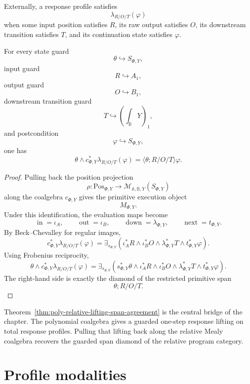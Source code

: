 Externally, a response profile satisfies
\[
\lambda_{R/O/T}(\varphi)
\]
when some input position satisfies \(R\), its raw output satisfies \(O\), its
downstream transition satisfies \(T\), and its continuation state satisfies
\(\varphi\).

\begin{theorem}
\label{thm:poly-relative-lifting-span-agreement}
For every state guard
\[
\theta\hookrightarrow S_{\Phi,Y},
\]
input guard
\[
R\hookrightarrow A_1,
\]
output guard
\[
O\hookrightarrow B_1,
\]
downstream transition guard
\[
T\hookrightarrow\left(\int_{\mathbb B}Y\right)_1,
\]
and postcondition
\[
\varphi\hookrightarrow S_{\Phi,Y},
\]
one has
\[
\theta\wedge c_{\Phi,Y}^{\ast}\lambda_{R/O/T}(\varphi)
=
\langle \theta;R/O/T\rangle\varphi.
\]
\end{theorem}

\begin{proof}
Pulling back the position projection
\[
\rho:\mathrm{Pos}_{\Phi,Y}\to
\mathcal M_{\mathbb A,\mathbb B,Y}(S_{\Phi,Y})
\]
along the coalgebra \(c_{\Phi,Y}\) gives the primitive execution object
\[
M_{\Phi,Y}.
\]
Under this identification, the evaluation maps become
\[
\operatorname{in}=\iota_A,
\qquad
\operatorname{out}=\iota_B,
\qquad
\operatorname{down}=\lambda_{\Phi,Y},
\qquad
\operatorname{next}=t_{\Phi,Y}.
\]
By Beck--Chevalley for regular images,
\[
c_{\Phi,Y}^{\ast}\lambda_{R/O/T}(\varphi)
=
\exists_{s_{\Phi,Y}}
\left(
\iota_A^\ast R
\wedge
\iota_B^\ast O
\wedge
\lambda_{\Phi,Y}^\ast T
\wedge
t_{\Phi,Y}^\ast\varphi
\right).
\]
Using Frobenius reciprocity,
\[
\theta\wedge c_{\Phi,Y}^{\ast}\lambda_{R/O/T}(\varphi)
=
\exists_{s_{\Phi,Y}}
\left(
s_{\Phi,Y}^\ast\theta
\wedge
\iota_A^\ast R
\wedge
\iota_B^\ast O
\wedge
\lambda_{\Phi,Y}^\ast T
\wedge
t_{\Phi,Y}^\ast\varphi
\right).
\]
The right-hand side is exactly the diamond of the restricted primitive span
\[
\theta;R/O/T.
\]
\end{proof}

\begin{remark}
\label{rem:poly-relative-central-comparison}
Theorem~\ref{thm:poly-relative-lifting-span-agreement} is the central bridge
of the chapter.  The polynomial coalgebra gives a guarded one-step response
lifting on total response profiles.  Pulling that lifting back along the
relative Mealy coalgebra recovers the guarded span diamond of the relative
program category.
\end{remark}

\section{Profile modalities}
\label{sec:poly-relative-profile-modalities}

